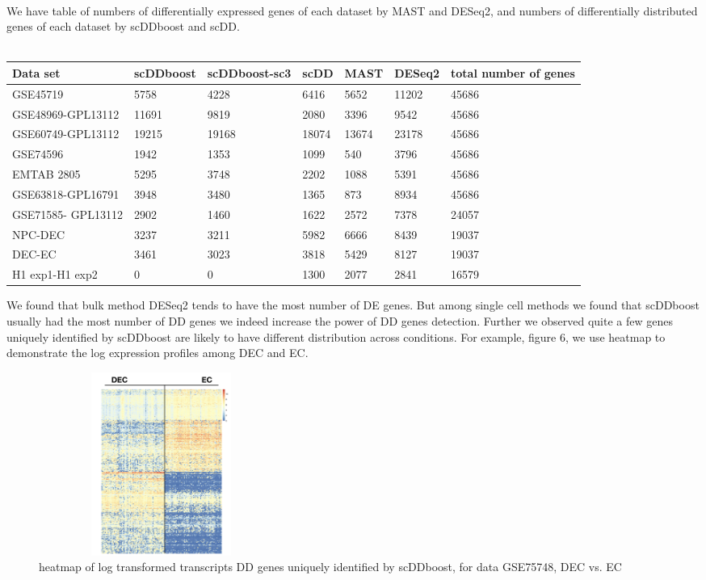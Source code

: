 \documentclass[11pt]{amsart}
\begin{document}
\hfill\\
We have table of numbers of differentially expressed genes of each dataset by MAST and DESeq2, and numbers of differentially distributed genes of each dataset by scDDboost and scDD.\\
\\
\begin{center}
\begin{tabular}{ |p{2cm}|p{2cm}|p{2cm}|p{2cm}|p{2cm}|p{2cm}|p{2cm}|}
\hline
Data set & scDDboost & scDDboost-sc3 & scDD & MAST & DESeq2 & total number of genes\\
\hline
\hline
GSE45719 & 5758 & 4228 & 6416 &5652 & 11202 & 45686\\
\hline
GSE48969-GPL13112 & 11691 & 9819 & 2080 & 3396 & 9542 & 45686\\
\hline
GSE60749-GPL13112 & 19215 & 19168 &  18074 & 13674 & 23178 & 45686\\
\hline
GSE74596 & 1942 & 1353 & 1099 & 540 & 3796 & 45686\\
\hline
EMTAB 2805 & 5295 & 3748 & 2202 & 1088 & 5391 & 45686\\
\hline
GSE63818-GPL16791 & 3948 & 3480 & 1365 & 873 & 8934 & 45686\\
\hline
GSE71585- GPL13112 & 2902 & 1460 & 1622 & 2572 & 7378 & 24057 \\
\hline
NPC-DEC & 3237 & 3211 & 5982 & 6666 & 8439 & 19037\\
\hline
DEC-EC & 3461 & 3023 & 3818 & 5429 & 8127 & 19037\\
\hline
H1 exp1-H1 exp2 &  0 & 0 & 1300 & 2077 & 2841 & 16579\\
\hline
\end{tabular}
\end{center}
We found that bulk method DESeq2 tends to have the most number of DE genes. But among single cell methods we found that scDDboost usually had the most number of DD genes we indeed increase the power of DD genes detection. Further we observed quite a few genes uniquely identified by scDDboost are likely to have different distribution across conditions. For example, figure 6, we use heatmap to demonstrate the log expression profiles among DEC and EC. \\
\begin{figure}[h]
\includegraphics[height = 6cm, width = 8cm]{heat.png}
 \caption{heatmap of log transformed transcripts DD genes uniquely identified by scDDboost, for data GSE75748, DEC vs. EC}
  \label{fig:6}
\end{figure}
\end{document}
